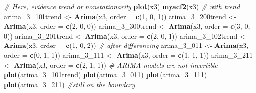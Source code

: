 \documentclass[]{book}
\newenvironment{Shaded}{\begin{snugshade}}{\end{snugshade}}
\newcommand{\CommentTok}[1]{\textcolor[rgb]{0.56,0.35,0.01}{\textit{#1}}}
\newcommand{\DataTypeTok}[1]{\textcolor[rgb]{0.13,0.29,0.53}{#1}}
\newcommand{\DecValTok}[1]{\textcolor[rgb]{0.00,0.00,0.81}{#1}}
\newcommand{\KeywordTok}[1]{\textcolor[rgb]{0.13,0.29,0.53}{\textbf{#1}}}
\newcommand{\NormalTok}[1]{#1}
\newcommand{\StringTok}[1]{\textcolor[rgb]{0.31,0.60,0.02}{#1}}
\begin{document}
\begin{Shaded}
\begin{Highlighting}[]
\CommentTok{# Here, evidence trend or nonstationarity}
\KeywordTok{plot}\NormalTok{(x3)}
\KeywordTok{myacf2}\NormalTok{(x3)}
\CommentTok{# with trend}
\NormalTok{arima_}\DecValTok{3}\NormalTok{_101trend <-}\StringTok{ }\KeywordTok{Arima}\NormalTok{(x3, }\DataTypeTok{order =} \KeywordTok{c}\NormalTok{(}\DecValTok{1}\NormalTok{, }\DecValTok{0}\NormalTok{, }\DecValTok{1}\NormalTok{))}
\NormalTok{arima_}\DecValTok{3}\NormalTok{_200trend <-}\StringTok{ }\KeywordTok{Arima}\NormalTok{(x3, }\DataTypeTok{order =} \KeywordTok{c}\NormalTok{(}\DecValTok{2}\NormalTok{, }\DecValTok{0}\NormalTok{, }\DecValTok{0}\NormalTok{))}
\NormalTok{arima_}\DecValTok{3}\NormalTok{_300trend <-}\StringTok{ }\KeywordTok{Arima}\NormalTok{(x3, }\DataTypeTok{order =} \KeywordTok{c}\NormalTok{(}\DecValTok{3}\NormalTok{, }\DecValTok{0}\NormalTok{, }\DecValTok{0}\NormalTok{))}
\NormalTok{arima_}\DecValTok{3}\NormalTok{_201trend <-}\StringTok{ }\KeywordTok{Arima}\NormalTok{(x3, }\DataTypeTok{order =} \KeywordTok{c}\NormalTok{(}\DecValTok{2}\NormalTok{, }\DecValTok{0}\NormalTok{, }\DecValTok{1}\NormalTok{))}
\NormalTok{arima_}\DecValTok{3}\NormalTok{_102trend <-}\StringTok{ }\KeywordTok{Arima}\NormalTok{(x3, }\DataTypeTok{order =} \KeywordTok{c}\NormalTok{(}\DecValTok{1}\NormalTok{, }\DecValTok{0}\NormalTok{, }\DecValTok{2}\NormalTok{))}
\CommentTok{# after differencing}
\NormalTok{arima_}\DecValTok{3}\NormalTok{_}\DecValTok{011}\NormalTok{ <-}\StringTok{ }\KeywordTok{Arima}\NormalTok{(x3, }\DataTypeTok{order =} \KeywordTok{c}\NormalTok{(}\DecValTok{0}\NormalTok{, }\DecValTok{1}\NormalTok{, }\DecValTok{1}\NormalTok{))}
\NormalTok{arima_}\DecValTok{3}\NormalTok{_}\DecValTok{111}\NormalTok{ <-}\StringTok{ }\KeywordTok{Arima}\NormalTok{(x3, }\DataTypeTok{order =} \KeywordTok{c}\NormalTok{(}\DecValTok{1}\NormalTok{, }\DecValTok{1}\NormalTok{, }\DecValTok{1}\NormalTok{))}
\NormalTok{arima_}\DecValTok{3}\NormalTok{_}\DecValTok{211}\NormalTok{ <-}\StringTok{ }\KeywordTok{Arima}\NormalTok{(x3, }\DataTypeTok{order =} \KeywordTok{c}\NormalTok{(}\DecValTok{2}\NormalTok{, }\DecValTok{1}\NormalTok{, }\DecValTok{1}\NormalTok{))}
\CommentTok{# ARIMA models are not invertible}
\KeywordTok{plot}\NormalTok{(arima_}\DecValTok{3}\NormalTok{_101trend)}
\KeywordTok{plot}\NormalTok{(arima_}\DecValTok{3}\NormalTok{_}\DecValTok{011}\NormalTok{)}
\KeywordTok{plot}\NormalTok{(arima_}\DecValTok{3}\NormalTok{_}\DecValTok{111}\NormalTok{)}
\KeywordTok{plot}\NormalTok{(arima_}\DecValTok{3}\NormalTok{_}\DecValTok{211}\NormalTok{)  }\CommentTok{#still on the boundary}

\end{Highlighting}
\end{Shaded}
\end{document}
